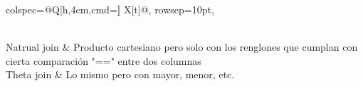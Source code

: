 \documentclass[letterpaper]{article}
\begin{document}
\begin{longtblr}{
    colspec={@{}Q[h,4cm,cmd=\textbf] X[t]@{}},
    rowsep={10pt},
  }
\begin{minipage}{\linewidth}
  \end{minipage}
  \\
  Natrual join
  & Producto cartesiano pero solo con los renglones que cumplan con cierta comparación "==" entre dos columnas
  \\
  Theta join
  & Lo mismo pero con mayor, menor, etc.
\end{longtblr}
\end{document}
